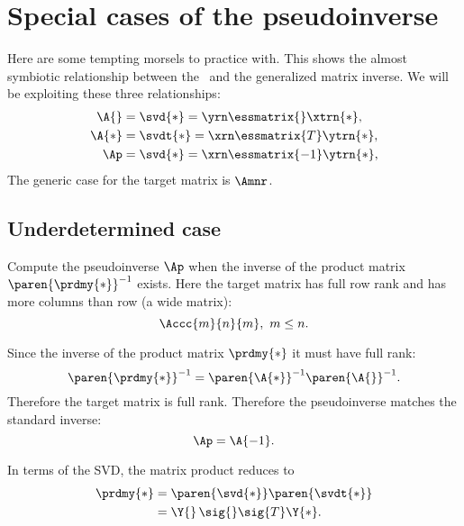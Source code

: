 \section{Special cases of the pseudoinverse}

Here are some tempting morsels to practice with. This shows the almost symbiotic relationship between the \svdl \ and the generalized matrix inverse. We will be exploiting these three relationships:
\begin{equation}
  \begin{split}
     \A{}  &= \svd{*} = \yrn \essmatrix{} \xtrn{*},\\
     \A{*} &= \svdt{*} = \xrn \essmatrix{T} \ytrn{*},\\
     \Ap   &= \svd{*} = \xrn \essmatrix{-1} \ytrn{*},\\
  \end{split}
\end{equation}
The generic case for the target matrix is $\Amnr$.

\subsection{Underdetermined case}
\label{sec:underdetermined}
Compute the pseudoinverse $\Ap$ when the inverse of the product matrix $\paren{\prdmy{*}}^{-1}$ exists.
Here the target matrix has full row rank and has more columns than row (a wide matrix):
\begin{equation}
  \Accc{m}{n}{m}, \ m\le n.
\end{equation}

Since the inverse of the product matrix $\prdmy{*}$ it must have full rank:
\begin{equation}
  \paren{\prdmy{*}}^{-1} = \paren{\A{*}}^{-1}\paren{\A{}}^{-1}.
\end{equation}
Therefore the target matrix is full rank. Therefore the pseudoinverse matches the standard inverse: 
\begin{equation}
  \Ap = \A{-1}.
\end{equation}

In terms of the SVD, the matrix product reduces to
\begin{equation}
  \begin{split}
    \prdmy{*} & = \paren{\svd{*}}\paren{\svdt{*}}\\
      &= \Y{}\, \sig{}\sig{T}  \Y{*}.
  \end{split}
\end{equation}

